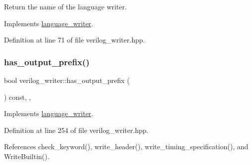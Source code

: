 Return the name of the language writer. 



Implements \hyperlink{classlanguage__writer_a6eabf4ff2972e00a392a0d2a8b4c5a3a}{language\+\_\+writer}.



Definition at line 71 of file verilog\+\_\+writer.\+hpp.

\mbox{\label{classverilog__writer_a33625c1b43ea1ee1fa7331cde5d83c8b}} 
\subsubsection{\texorpdfstring{has\+\_\+output\+\_\+prefix()}{has\_output\_prefix()}}
{\footnotesize\ttfamily bool verilog\+\_\+writer\+::has\+\_\+output\+\_\+prefix (\begin{DoxyParamCaption}{ }\end{DoxyParamCaption}) const\hspace{0.3cm}{\ttfamily [inline]}, {\ttfamily [override]}, {\ttfamily [virtual]}}



Implements \hyperlink{classlanguage__writer_a10d8bf3a0f71364bc3a72273c1172a34}{language\+\_\+writer}.



Definition at line 254 of file verilog\+\_\+writer.\+hpp.



References check\+\_\+keyword(), write\+\_\+header(), write\+\_\+timing\+\_\+specification(), and Write\+Builtin().

